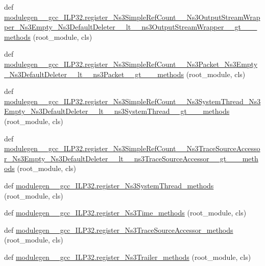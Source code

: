 \begin{DoxyCompactItemize}
\item 
def \hyperlink{namespacemodulegen____gcc__ILP32_a4d1d8838713af407eb5e2cdb71da8b0b}{modulegen\+\_\+\+\_\+gcc\+\_\+\+I\+L\+P32.\+register\+\_\+\+Ns3\+Simple\+Ref\+Count\+\_\+\+\_\+\+Ns3\+Output\+Stream\+Wrapper\+\_\+\+Ns3\+Empty\+\_\+\+Ns3\+Default\+Deleter\+\_\+\+\_\+lt\+\_\+\+\_\+ns3\+Output\+Stream\+Wrapper\+\_\+\+\_\+gt\+\_\+\+\_\+\+\_\+methods} (root\+\_\+module, cls)
\item 
def \hyperlink{namespacemodulegen____gcc__ILP32_a0ef742c28dd795a6ce9adfeac1b275b8}{modulegen\+\_\+\+\_\+gcc\+\_\+\+I\+L\+P32.\+register\+\_\+\+Ns3\+Simple\+Ref\+Count\+\_\+\+\_\+\+Ns3\+Packet\+\_\+\+Ns3\+Empty\+\_\+\+Ns3\+Default\+Deleter\+\_\+\+\_\+lt\+\_\+\+\_\+ns3\+Packet\+\_\+\+\_\+gt\+\_\+\+\_\+\+\_\+methods} (root\+\_\+module, cls)
\item 
def \hyperlink{namespacemodulegen____gcc__ILP32_a4ecd24f393a869102260a5e4a08d54a6}{modulegen\+\_\+\+\_\+gcc\+\_\+\+I\+L\+P32.\+register\+\_\+\+Ns3\+Simple\+Ref\+Count\+\_\+\+\_\+\+Ns3\+System\+Thread\+\_\+\+Ns3\+Empty\+\_\+\+Ns3\+Default\+Deleter\+\_\+\+\_\+lt\+\_\+\+\_\+ns3\+System\+Thread\+\_\+\+\_\+gt\+\_\+\+\_\+\+\_\+methods} (root\+\_\+module, cls)
\item 
def \hyperlink{namespacemodulegen____gcc__ILP32_a54ea4c3c62de90cf295c66cffbc336c8}{modulegen\+\_\+\+\_\+gcc\+\_\+\+I\+L\+P32.\+register\+\_\+\+Ns3\+Simple\+Ref\+Count\+\_\+\+\_\+\+Ns3\+Trace\+Source\+Accessor\+\_\+\+Ns3\+Empty\+\_\+\+Ns3\+Default\+Deleter\+\_\+\+\_\+lt\+\_\+\+\_\+ns3\+Trace\+Source\+Accessor\+\_\+\+\_\+gt\+\_\+\+\_\+\+\_\+methods} (root\+\_\+module, cls)
\item 
def \hyperlink{namespacemodulegen____gcc__ILP32_a1aee0956b4a8fac8a83a6ec214c3e91d}{modulegen\+\_\+\+\_\+gcc\+\_\+\+I\+L\+P32.\+register\+\_\+\+Ns3\+System\+Thread\+\_\+methods} (root\+\_\+module, cls)
\item 
def \hyperlink{namespacemodulegen____gcc__ILP32_a4bcbbf479533e8b6fb238739668fe36d}{modulegen\+\_\+\+\_\+gcc\+\_\+\+I\+L\+P32.\+register\+\_\+\+Ns3\+Time\+\_\+methods} (root\+\_\+module, cls)
\item 
def \hyperlink{namespacemodulegen____gcc__ILP32_a3451d08858386f1fa04131d165c83ba0}{modulegen\+\_\+\+\_\+gcc\+\_\+\+I\+L\+P32.\+register\+\_\+\+Ns3\+Trace\+Source\+Accessor\+\_\+methods} (root\+\_\+module, cls)
\item 
def \hyperlink{namespacemodulegen____gcc__ILP32_a7be1ac5e0e1a8ec544474f384e1642fc}{modulegen\+\_\+\+\_\+gcc\+\_\+\+I\+L\+P32.\+register\+\_\+\+Ns3\+Trailer\+\_\+methods} (root\+\_\+module, cls)

\end{DoxyCompactItemize}
